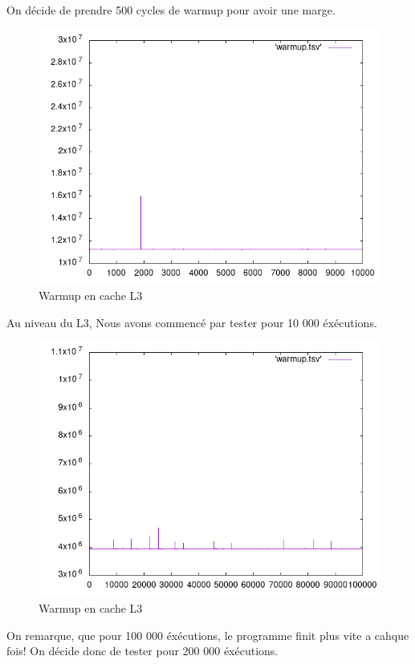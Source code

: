 \documentclass{report}
\begin{document}
    On décide de prendre 500 cycles de warmup pour avoir une marge.

\newpage 
    \begin{figure}[ht!]
        \centering
        \includegraphics[width=120mm]{MEDIA/warmupL3_NOCstate.png}
        \caption{Warmup en cache L3}
    \end{figure}

Au niveau du L3, Nous avons commencé par tester pour 10 000 éxécutions. 

\newpage 
    \begin{figure}[ht!]
        \centering
        \includegraphics[width=120mm]{MEDIA/warmupL3_100000.png}
        \caption{Warmup en cache L3 }
    \end{figure}

On remarque, que pour 100 000 éxécutions, le programme finit plus vite a cahque fois!
On décide donc de tester pour 200 000 éxécutions.
\end{document}
